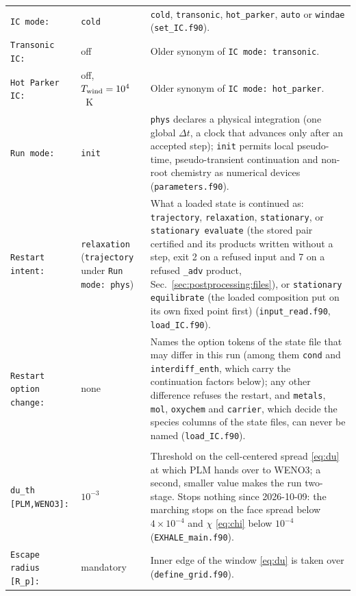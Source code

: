{\begin{longtable}{@{}>{\raggedright\arraybackslash}p{}>{\raggedright\arraybackslash}p{}>{\raggedright\arraybackslash}p{}@{}}
\texttt{IC mode:} & \texttt{cold} &
  \texttt{cold}, \texttt{transonic}, \texttt{hot\_parker}, \texttt{auto} or
  \texttt{windae} (\texttt{set\_IC.f90}). \\
\texttt{Transonic IC:} & off &
  Older synonym of \texttt{IC mode: transonic}. \\
\texttt{Hot Parker IC:} & off, $T_{\rm wind}=10^4$~K &
  Older synonym of \texttt{IC mode: hot\_parker}. \\
\texttt{Run mode:} & \texttt{init} &
  \texttt{phys} declares a physical integration (one global $\Delta t$, a
  clock that advances only after an accepted step); \texttt{init} permits
  local pseudo-time, pseudo-transient continuation and non-root chemistry as
  numerical devices (\texttt{parameters.f90}). \\
\texttt{Restart intent:} & \texttt{relaxation} (\texttt{trajectory} under
  \texttt{Run mode: phys}) &
  What a loaded state is continued as: \texttt{trajectory},
  \texttt{relaxation}, \texttt{stationary}, or \texttt{stationary evaluate}
  (the stored pair certified and its products written without a step, exit
  2 on a refused input and 7 on a refused \texttt{\_adv} product,
  Sec.~\ref{sec:postprocessing:files}), or \texttt{stationary equilibrate}
  (the loaded composition put on its own fixed point first)
  (\texttt{input\_read.f90}, \texttt{load\_IC.f90}). \\
\texttt{Restart option change:} & none &
  Names the option tokens of the state file that may differ in this run
  (among them \texttt{cond} and \texttt{interdiff\_enth}, which carry the
  continuation factors below); any other difference refuses the restart,
  and \texttt{metals}, \texttt{mol}, \texttt{oxychem} and \texttt{carrier},
  which decide the species columns of the state files, can never be named
  (\texttt{load\_IC.f90}). \\
\midrule
\multicolumn{3}{l}{\itshape Convergence and the stationary solvers}\\
\midrule
\texttt{du\_th [PLM,WENO3]:} & $10^{-3}$ &
  Threshold on the cell-centered spread \eqref{eq:du} at which PLM hands over
  to WENO3; a second, smaller value makes the run two-stage. Stops nothing
  since 2026-10-09: the marching stops on the face spread below
  $4\times10^{-4}$ and $\chi$ \eqref{eq:chi} below $10^{-4}$
  (\texttt{EXHALE\_main.f90}). \\
\texttt{Escape radius [R\_p]:} & mandatory &
  Inner edge of the window \eqref{eq:du} is taken over
  (\texttt{define\_grid.f90}). \\

\end{longtable}}
